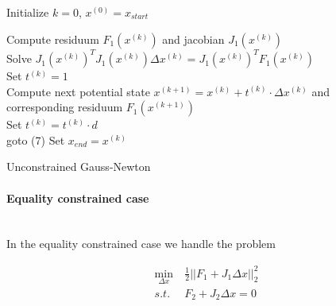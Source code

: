 \documentclass{scrartcl}[12pt, halfparskip]
\numberwithin{equation}{section}
\numberwithin{figure}{section}
\numberwithin{table}{section}
\begin{document}
\begin{algorithm}[H]
	
	
	
	Initialize $k=0$, $x^{(0)} = x_{start}$
	
	{
		Compute residuum $F_1(x^{(k)})$ and jacobian $J_1(x^{(k)})$ \\
		Solve $J_1(x^{(k)})^T J_1(x^{(k)}) \Delta x^{(k)} = J_1(x^{(k)})^T F_1(x^{(k)})$ \\
		Set $t^{(k)} = 1$ \\
		Compute next potential state $x^{(k+1)} = x^{(k)} + t^{(k)} \cdot \Delta x^{(k)}$ and \\ \quad corresponding residuum $F_1(x^{(k+1)})$ \\
		
		{Set $t^{(k)} = t^{(k)} \cdot d$ \\
			goto (7)}
	}
	Set $x_{end} = x^{(k)}$
	\caption{Unconstrained Gauss-Newton}
	\label{alg:Gauss_Newton_unconstrained}
\end{algorithm}

\vspace{0.5cm}
\paragraph{Equality constrained case}\mbox{}\\
In the equality constrained case we handle the problem

\begin{align}
	\min_{\Delta x} & \ \frac{1}{2} || F_1 + J_1 \Delta x ||_2^2 \label{eq:numerical_soln_eq_constrained_LSQ} \\
	s.t. & \ F_2 + J_2 \Delta x = 0 \nonumber
\end{align}
\end{document}
